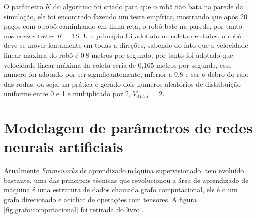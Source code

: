 O parâmetro $K$ do algoritmo foi criado para que o robô não bata na parede
da simulação, ele foi encontrado fazendo um teste empírico, mostrando que
após 20 paços  com o robô caminhando em linha reta, o robô bate na parede,
por tanto nos nossos testes $K = 18$. Um princípio foi adotado na coleta
de dados: o robô deve-se mover lentamente em todas a direções, sabendo do
fato que a velocidade linear máxima do robô é 0,8 metros por segundo,
por tanto foi adotado que velocidade linear máxima da coleta seria de 
0,165 metros por segundo, esse número foi adotado por ser significantemente,
inferior a 0,8  e ser o dobro do raio das rodas, ou seja, na prática é gerado
dois números aleatórios de distribuição uniforme entre 0 e 1 e multiplicado por
2, $V_{MAX} = 2$.

\section{Modelagem de parâmetros de redes neurais artificiais}
Atualmente \textit{Frameworks} de aprendizado máquina supervisionado,
tem evoluído bastante, uma das principais técnicas que revolucionou a
área de aprendizado de máquina é uma estrutura de dados chamada grafo
computacional, ele é o um grafo direcionado e acíclico de operações com
tensores. A figura \ref{fig:grafo:computacional} foi retirada do livro
\cite{chollet2021deep}.


